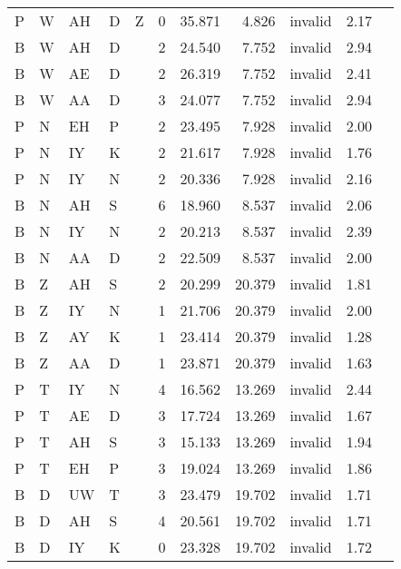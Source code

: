\begin{longtable}{l@{ } l@{ } l@{ } l@{ } l r r r r r r}
P & W & AH & D &  Z &  0 & 35.871 &  4.826  &  invalid & 2.17 \\
B & W & AH & D &    &  2 & 24.540 &  7.752  &  invalid & 2.94 \\
B & W & AE & D &    &  2 & 26.319 &  7.752  &  invalid & 2.41 \\
B & W & AA & D &    &  3 & 24.077 &  7.752  &  invalid & 2.94 \\
P & N & EH & P &    &  2 & 23.495 &  7.928  &  invalid & 2.00 \\
P & N & IY & K &    &  2 & 21.617 &  7.928  &  invalid & 1.76 \\
P & N & IY & N &    &  2 & 20.336 &  7.928  &  invalid & 2.16 \\
B & N & AH & S &    &  6 & 18.960 &  8.537  &  invalid & 2.06 \\
B & N & IY & N &    &  2 & 20.213 &  8.537  &  invalid & 2.39 \\
B & N & AA & D &    &  2 & 22.509 &  8.537  &  invalid & 2.00 \\
B & Z & AH & S &    &  2 & 20.299 &  20.379 &  invalid & 1.81 \\
B & Z & IY & N &    &  1 & 21.706 &  20.379 &  invalid & 2.00 \\
B & Z & AY & K &    &  1 & 23.414 &  20.379 &  invalid & 1.28 \\
B & Z & AA & D &    &  1 & 23.871 &  20.379 &  invalid & 1.63 \\
P & T & IY & N &    &  4 & 16.562 &  13.269 &  invalid & 2.44 \\
P & T & AE & D &    &  3 & 17.724 &  13.269 &  invalid & 1.67 \\
P & T & AH & S &    &  3 & 15.133 &  13.269 &  invalid & 1.94 \\
P & T & EH & P &    &  3 & 19.024 &  13.269 &  invalid & 1.86 \\
B & D & UW & T &    &  3 & 23.479 &  19.702 &  invalid & 1.71 \\
B & D & AH & S &    &  4 & 20.561 &  19.702 &  invalid & 1.71 \\
B & D & IY & K &    &  0 & 23.328 &  19.702 &  invalid & 1.72 \\
\bottomrule
\end{longtable}
